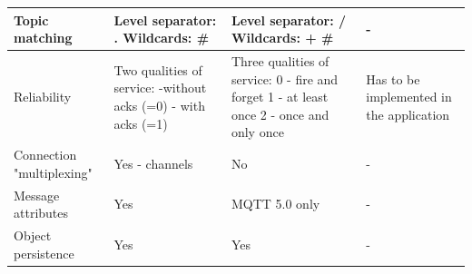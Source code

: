 \begin{table}[htbp]
\begin{center}
\begin{tabular}{|p{3cm}|p{4.5cm}|p{4.5cm}|p{4.5cm}|}
    \hline
    Topic matching & Level separator: . Wildcards: \* \# & Level separator: / Wildcards: + \# & - \\
    \hline
    Reliability & Two qualities of service: -without acks (=0) - with acks (=1) & Three qualities of service: 0 - fire and forget 1 - at least once 2 - once and only once & Has to be implemented in the application\\
    \hline
    Connection "multiplexing" & Yes - channels & No & -\\
    \hline
    Message attributes & Yes & MQTT 5.0 only & -\\
    \hline
    Object persistence & Yes & Yes & -\\
    \hline
    \end{tabular}
    \label{tab-1}
    \end{center}
    \end{table}